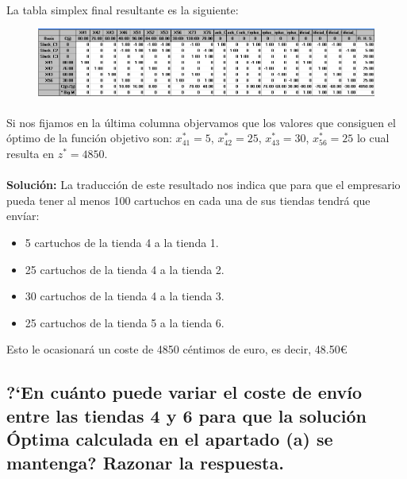 \documentclass[10pt, a4paper]{article}
\begin{document}
			\paragraph{}
			La tabla simplex final resultante es la siguiente:

			\begin{figure}[H]
	        \centering
	            \includegraphics[width=\textwidth]{res/Exercise_1_pp_simplex_final.png}
	        \end{figure}

			\paragraph{}
			Si nos fijamos en la última columna objervamos que los valores que consiguen el óptimo de la función objetivo son:
			\(x_{41}^{*} = 5 \), \(x_{42}^{*} = 25 \), \(x_{43}^{*} = 30 \), \(x_{56}^{*} = 25 \) lo cual resulta en \(z^{*} = 4850 \).

			\paragraph{}
			\textbf{Solución:} La traducción de este resultado nos indica que para que el empresario pueda tener al menos 100 cartuchos en cada una de sus tiendas tendrá que envíar:

			\begin{itemize}
				\item 5 cartuchos de la tienda 4 a la tienda 1.
				\item 25 cartuchos de la tienda 4 a la tienda 2.
				\item 30 cartuchos de la tienda 4 a la tienda 3.
				\item 25 cartuchos de la tienda 5 a la tienda 6.
			\end{itemize}

			Esto le ocasionará un coste de 4850 céntimos de euro, es decir, 48.50\euro

		\subsection{?`En cuánto puede variar el coste de envío entre las tiendas 4 y 6 para que la solución Óptima calculada en el apartado (a) se mantenga? Razonar la respuesta.}
\end{document}
